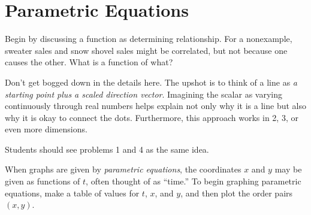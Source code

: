 
\newpage

\section{Parametric Equations}

\begin{teachingnote}
Begin by discussing a function as determining relationship.  For a nonexample, sweater sales and snow shovel sales might be correlated, but not because one causes the other.  What is a function of what?  

Don't get bogged down in the details here.  The upshot is to think of a line as \emph{a starting point plus a scaled direction vector}.  Imagining the scalar as varying continuously through real numbers helps explain not only why it is a line but also why it is okay to connect the dots.  Furthermore, this approach works in 2, 3, or even more dimensions.  

Students should see problems 1 and 4 as the same idea.  
\end{teachingnote}

%

\begin{definition}
When graphs are given by \emph{parametric equations}, the coordinates $x$ and $y$ may be given as functions of $t$, often thought of as ``time.''  To begin graphing parametric equations, make a table of values for $t$, $x$, and $y$, and then plot the order pairs $(x, y)$.  
\end{definition}

